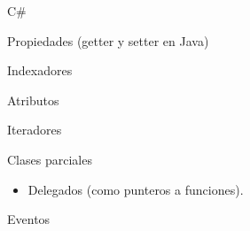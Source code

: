 \documentclass{beamer}
\begin{document}
\begin{frame}{C\#}
  \begin{exampleblock}{Propiedades (getter y setter en Java)}
    \begin{scriptsize}
      
    \end{scriptsize}
  \end{exampleblock}
\end{frame}

\begin{frame}
  \begin{exampleblock}{Indexadores}
    
  \end{exampleblock}
\end{frame}

\begin{frame}
  \begin{exampleblock}{Atributos}
    
  \end{exampleblock}
\end{frame}

\begin{frame}
  \begin{exampleblock}{Iteradores}
    \begin{scriptsize}
      
    \end{scriptsize}
  \end{exampleblock}
\end{frame}

\begin{frame}
  \begin{exampleblock}{Clases parciales}
    \begin{scriptsize}
      
    \end{scriptsize}
  \end{exampleblock}
\end{frame}

\begin{frame}
  \begin{itemize}
    \item Delegados (como punteros a funciones).
  \end{itemize}

  \pause
  \begin{exampleblock}{Eventos}
    \begin{scriptsize}
      
    \end{scriptsize}
  \end{exampleblock}
\end{frame}
\end{document}
